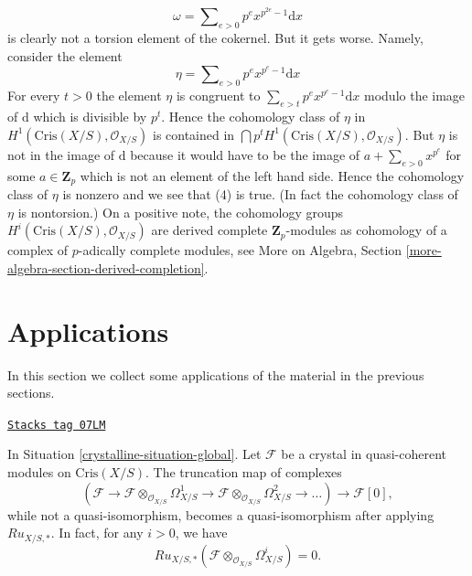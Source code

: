 \begin{example}
$$
\omega = \sum\nolimits_{e > 0} p^e x^{p^{2e} - 1}\text{d}x
$$
is clearly not a torsion element of the cokernel. But it gets worse.
Namely, consider the element
$$
\eta = \sum\nolimits_{e > 0} p^e x^{p^e - 1}\text{d}x
$$
For every $t > 0$ the element $\eta$ is congruent to
$\sum_{e > t} p^e x^{p^e - 1}\text{d}x$ modulo the image of
$\text{d}$ which is divisible by $p^t$. Hence the cohomology
class of $\eta$ in $H^1(\text{Cris}(X/S), \mathcal{O}_{X/S})$
is contained in $\bigcap p^tH^1(\text{Cris}(X/S), \mathcal{O}_{X/S})$.
But $\eta$ is not in the image of $\text{d}$ because it would have
to be the image of $a + \sum_{e > 0} x^{p^e}$ for some $a \in \mathbf{Z}_p$
which is not an element of the left hand side.
Hence the cohomology class of $\eta$ is nonzero and we see that
(4) is true. (In fact the cohomology class of $\eta$ is nontorsion.)
On a positive note, the cohomology groups
$H^i(\text{Cris}(X/S), \mathcal{O}_{X/S})$
are derived complete $\mathbf{Z}_p$-modules as cohomology of
a complex of $p$-adically complete modules, see
More on Algebra, Section \ref{more-algebra-section-derived-completion}.
\end{example}

\section{Applications}
\label{crystalline-section-applications}
In this section we collect some applications of the material in
the previous sections.

\begin{proposition}
\label{crystalline-proposition-compare-with-de-Rham}
\href{https://stacks.math.columbia.edu/tag/07LM}{\texttt{Stacks tag 07LM}}

In Situation \ref{crystalline-situation-global}.
Let $\mathcal{F}$ be a crystal in quasi-coherent modules on
$\text{Cris}(X/S)$. The truncation map of complexes
$$
(\mathcal{F} \to
\mathcal{F} \otimes_{\mathcal{O}_{X/S}} \Omega^1_{X/S} \to
\mathcal{F} \otimes_{\mathcal{O}_{X/S}} \Omega^2_{X/S} \to \ldots)
\longrightarrow \mathcal{F}[0],
$$
while not a quasi-isomorphism, becomes a quasi-isomorphism after applying
$Ru_{X/S, *}$. In fact, for any $i > 0$, we have
$$
Ru_{X/S, *}(\mathcal{F} \otimes_{\mathcal{O}_{X/S}} \Omega^i_{X/S}) = 0.
$$
\end{proposition}

